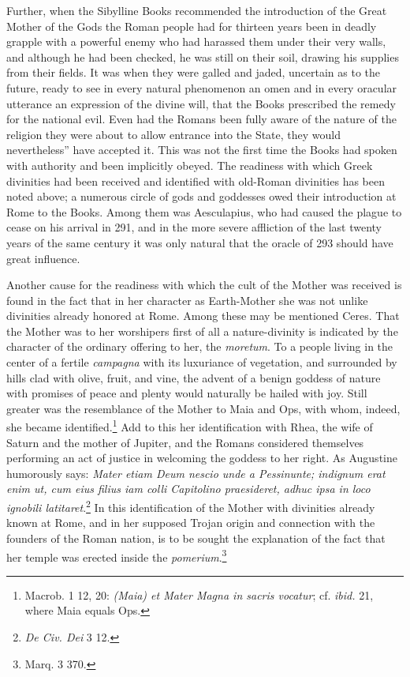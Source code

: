 \documentclass[a4paper, 11pt, oneside, polutonikogreek, english]{article}
\begin{document}
Further, when the Sibylline Books recommended the introduction of the Great Mother of the Gods the Roman people had for thirteen years been in deadly grapple with a powerful enemy who had harassed them under their very walls, and although he had been checked, he was still on their soil, drawing his supplies from their fields. It was when they were galled and jaded, uncertain as to the future, ready to see in every natural phenomenon an omen and in every oracular utterance an expression of the divine will, that the Books prescribed the remedy for the national evil. Even had the Romans been fully aware of the nature of the religion they were about to allow entrance into the State, they would nevertheless'' have accepted it. This was not the first time the Books had spoken with authority and been implicitly obeyed. The readiness with which Greek divinities had been received and identified with old-Roman divinities has been noted above; a numerous circle of gods and goddesses owed their introduction at Rome to the Books. Among them was Aesculapius, who had caused the plague to cease on his arrival in 291, and in the more severe affliction of the last twenty years of the same century it was only natural that the oracle of 293 should have great influence.

Another cause for the readiness with which the cult of the Mother was received is found in the fact that in her character as Earth-Mother she was not unlike divinities already honored at Rome. Among these may be mentioned Ceres. That the Mother was to her worshipers first of all a nature-divinity is indicated by the character of the ordinary offering to her, the \emph{moretum}. To a people living in the center of a fertile \emph{campagna} with its luxuriance of vegetation, and surrounded by hills clad with olive, fruit, and vine, the advent of a benign goddess of nature with promises of peace and plenty would naturally be hailed with joy. Still greater was the resemblance of the Mother to Maia and Ops, with whom, indeed, she became identified.\footnote{Macrob. 1 12, 20: \emph{(Maia) et Mater Magna in sacris vocatur}; cf. \emph{ibid.} 21, where Maia equals Ops.} Add to this her identification with Rhea, the wife of Saturn and the mother of Jupiter, and the Romans considered themselves performing an act of justice in welcoming the goddess to her right. As Augustine humorously says: \emph{Mater etiam Deum nescio unde a Pessinunte; indignum erat enim ut, cum eius filius iam colli Capitolino praesideret, adhuc ipsa in loco ignobili latitaret}.\footnote{\emph{De Civ. Dei} 3 12.} In this identification of the Mother with divinities already known at Rome, and in her supposed Trojan origin and connection with the founders of the Roman nation, is to be sought the explanation of the fact that her temple was erected inside the \emph{pomerium}.\footnote{Marq. 3 370.}
\end{document}
